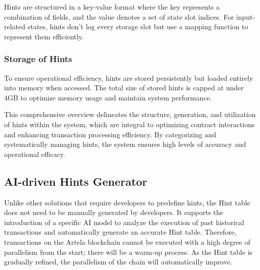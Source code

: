 Hints are structured in a key-value format where the key represents a combination of fields, and the value denotes a set of state slot indices. For input-related states, hints don’t log every storage slot but use a mapping function to represent them efficiently.

\subsubsection{Storage of Hints}

To ensure operational efficiency, hints are stored persistently but loaded entirely into memory when accessed. The total size of stored hints is capped at under 4GB to optimize memory usage and maintain system performance.

This comprehensive overview delineates the structure, generation, and utilization of hints within the system, which are integral to optimizing contract interactions and enhancing transaction processing efficiency. By categorizing and systematically managing hints, the system ensures high levels of accuracy and operational efficacy.

\subsection{AI-driven Hints Generator}

Unlike other solutions that require developers to predefine hints, the Hint table does not need to be manually generated by developers. It supports the introduction of a specific AI model to analyze the execution of past historical transactions and automatically generate an accurate Hint table. Therefore, transactions on the Artela blockchain cannot be executed with a high degree of parallelism from the start; there will be a warm-up process. As the Hint table is gradually refined, the parallelism of the chain will automatically improve.